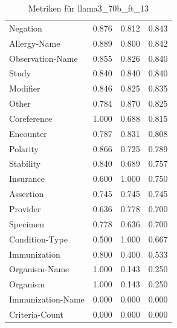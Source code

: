\begin{table}[htbp]
\begin{tabular}{p{5cm}ccc}
Negation & 0.876 & 0.812 & 0.843 \\
Allergy-Name & 0.889 & 0.800 & 0.842 \\
Observation-Name & 0.855 & 0.826 & 0.840 \\
Study & 0.840 & 0.840 & 0.840 \\
Modifier & 0.846 & 0.825 & 0.835 \\
Other & 0.784 & 0.870 & 0.825 \\
Coreference & 1.000 & 0.688 & 0.815 \\
Encounter & 0.787 & 0.831 & 0.808 \\
Polarity & 0.866 & 0.725 & 0.789 \\
Stability & 0.840 & 0.689 & 0.757 \\
Insurance & 0.600 & 1.000 & 0.750 \\
Assertion & 0.745 & 0.745 & 0.745 \\
Provider & 0.636 & 0.778 & 0.700 \\
Specimen & 0.778 & 0.636 & 0.700 \\
Condition-Type & 0.500 & 1.000 & 0.667 \\
Immunization & 0.800 & 0.400 & 0.533 \\
Organism-Name & 1.000 & 0.143 & 0.250 \\
Organism & 1.000 & 0.143 & 0.250 \\
Immunization-Name & 0.000 & 0.000 & 0.000 \\
Criteria-Count & 0.000 & 0.000 & 0.000 \\
\bottomrule
\end{tabular}
\caption{Metriken für llama3_70b_ft_13}
\label{tab:metrics_llama3_70b_ft_13}
\end{table}